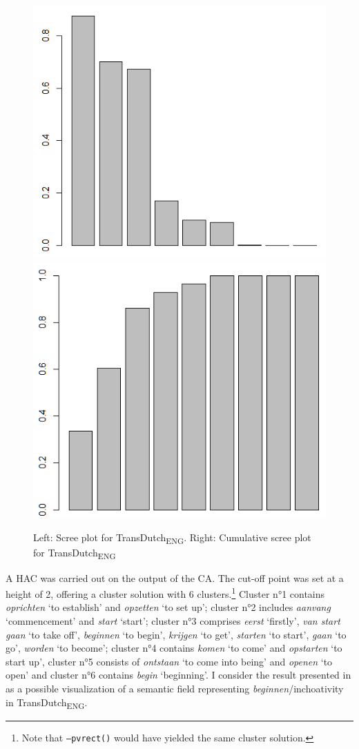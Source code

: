 \begin{figure}
\includegraphics[width=.48\textwidth]{figures/Vandevoorde2-img63.png}\hfill%
\includegraphics[width=.48\textwidth]{figures/Vandevoorde2-img64.png}
\caption{\label{fig:4:62}Left: Scree plot for TransDutch\textsubscript{ENG}. Right: \label{fig:4:63}Cumulative scree plot for TransDutch\textsubscript{ENG}}
\end{figure}

A HAC was carried out on the output of the CA. The cut-off point was set at a height of 2, offering a cluster solution with 6 clusters.\footnote{Note that \texttt{–pvrect()} would have yielded the same cluster solution.} Cluster n°1 contains \textit{oprichten} `to establish' and \textit{opzetten} `to set up'; cluster n°2 includes \textit{aanvang} `commencement' and \textit{start} `start'; cluster n°3 comprises \textit{eerst} `firstly', \textit{van start gaan} `to take off', \textit{beginnen} `to begin', \textit{krijgen} `to get', \textit{starten} `to start', \textit{gaan} `to go', \textit{worden} `to become'; cluster n°4 contains \textit{komen} `to come' and \textit{opstarten} `to start up', cluster n°5 consists of \textit{ontstaan} `to come into being' and \textit{openen} `to open' and cluster n°6 contains \textit{begin} `beginning'. I consider the result presented in  as a possible visualization of a semantic field representing \textit{beginnen}/inchoativity in TransDutch\textsubscript{ENG}.


